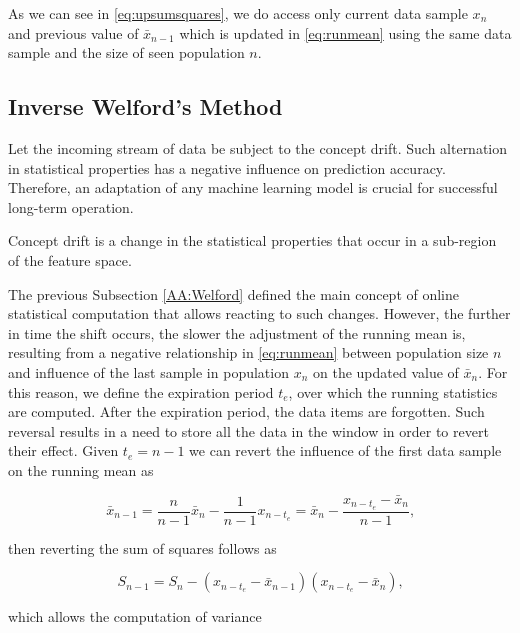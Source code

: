 As we can see in \eqref{eq:upsumsquares}, we do access only current data sample \(x_n\) and previous value of \(\bar x_{n-1}\) which is updated in \eqref{eq:runmean} using the same data sample and the size of seen population \(n\).

\subsection{Inverse Welford's Method}\label{AA:InvWelford}
Let the incoming stream of data be subject to the concept drift. Such alternation in statistical properties has a negative influence on prediction accuracy. Therefore, an adaptation of any machine learning model is crucial for successful long-term operation. 

\begin{definition}
Concept drift is a change in the statistical properties that occur in a sub-region of the feature space.
\end{definition}

The previous Subsection \ref{AA:Welford} defined the main concept of online statistical computation that allows reacting to such changes. However, the further in time the shift occurs, the slower the adjustment of the running mean is, resulting from a negative relationship in \eqref{eq:runmean} between population size \(n\) and influence of the last sample in population \(x_n\) on the updated value of \(\bar x_{n}\). For this reason, we define the expiration period \(t_e\), over which the running statistics are computed. After the expiration period, the data items are forgotten. Such reversal results in a need to store all the data in the window in order to revert their effect. Given \(t_e=n-1\) we can revert the influence of the first data sample on the running mean as

\begin{equation}
\bar x_{n-1} = \frac{n}{n-1} \bar x_{n} - \frac{1}{n-1}x_{n-t_e} = \bar x_{n} - \frac{x_{n-t_e} - \bar x_{n}}{n-1}\text{,}\label{eq:revmean}
\end{equation}

then reverting the sum of squares follows as

\begin{equation}
S_{n-1} = S_n - (x_{n-t_e} - \bar x_{n-1})(x_{n-t_e} - \bar x_n)\text{,}\label{eq:revrunmean}
\end{equation}

which allows the computation of variance 


